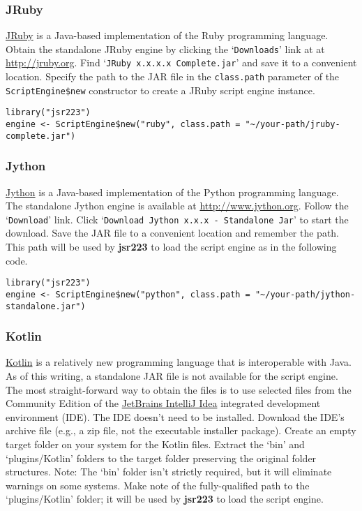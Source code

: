 \documentclass[
article,
11pt, %
a4paper, %
oneside, %
headinclude,footinclude, %
]{scrartcl}
\theoremstyle{definition} %
\theoremstyle{plain} %
\theoremstyle{remark} %
\newcommand{\pkg}[1]{\textbf{#1}}
\newcommand{\code}[1]{\texttt{#1}}
\newcommand{\file}[1]{{`\normalfont\textsf{#1}'}}
\newcommand{\samp}[1]{{`\normalfont\texttt{#1}'}}
\newcommand{\strong}[1]{\texorpdfstring{{\normalfont\fontseries{b}\selectfont #1}}{#1}}
\begin{document}
\subsubsection{JRuby}

\href{http://jruby.org}{JRuby} is a Java-based implementation of the Ruby programming language. Obtain the standalone JRuby engine by clicking the \samp{Downloads} link at at \url{http://jruby.org}. Find \samp{JRuby x.x.x.x Complete.jar} and save it to a convenient location. Specify the path to the JAR file in the \code{class.path} parameter of the \code{ScriptEngine\$new} constructor to create a JRuby script engine instance.

\begin{verbatim}
library("jsr223")
engine <- ScriptEngine$new("ruby", class.path = "~/your-path/jruby-complete.jar")
\end{verbatim}

\subsubsection{Jython}

\href{http://www.jython.org}{Jython} is a Java-based implementation of the Python programming language. The standalone Jython engine is available at \url{http://www.jython.org}. Follow the \samp{Download} link. Click \samp{Download Jython x.x.x - Standalone Jar} to start the download. Save the JAR file to a convenient location and remember the path. This path will be used by \pkg{jsr223} to load the script engine as in the following code.

\begin{verbatim}
library("jsr223")
engine <- ScriptEngine$new("python", class.path = "~/your-path/jython-standalone.jar")
\end{verbatim}

\hypertarget{kotlin-script-engine-installation}{}
\subsubsection{Kotlin}

\href{https://kotlinlang.org/}{Kotlin} is a relatively new programming language that is interoperable with Java. As of this writing, a standalone JAR file is not available for the script engine. The most straight-forward way to obtain the files is to use selected files from the Community Edition of the \href{https://www.jetbrains.com/idea/}{JetBrains IntelliJ Idea} integrated development environment (IDE). The IDE doesn't need to be installed. Download the IDE's archive file (e.g., a zip file, not the executable installer package). Create an empty target folder on your system for the Kotlin files. Extract the \file{bin} and \file{plugins/Kotlin} folders to the target folder preserving the original folder structures. \strong{Note:} The \file{bin} folder isn't strictly required, but it will eliminate warnings on some systems. Make note of the fully-qualified path to the \file{plugins/Kotlin} folder; it will be used by \pkg{jsr223} to load the script engine.
\end{document}
